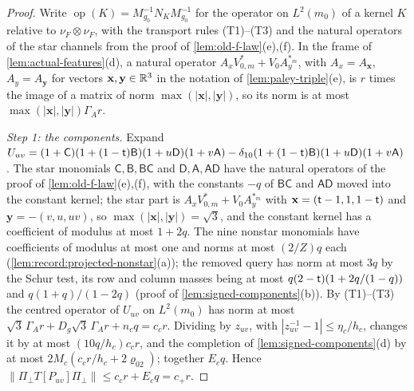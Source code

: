 \begin{proof}
Write $\operatorname{op}(K)=M_{g_0}^{-1}N_KM_{g_0}^{-1}$ for the operator on
$L^2(m_0)$ of a kernel $K$ relative to $\nu_F\otimes\nu_F$, with the transport
rules (T1)--(T3) and the natural operators of the star channels from the
proof of \cref{lem:old-f-law}(e),(f). In the frame of
\cref{lem:actual-features}(d), a natural operator $A_xV^*_{0,m}+V_0A_y^{*_m}$, with
$A_x=A_{\mathbf x}$, $A_y=A_{\mathbf y}$ for vectors $\mathbf x,\mathbf y\in\mathbb R^3$ in the
notation of \cref{lem:paley-triple}(e), is $r$ times the image of a matrix of norm
$\max(|\mathbf x|,|\mathbf y|)$, so its norm is at most $\max(|\mathbf x|,|\mathbf y|)\Gamma_Ar$.

\emph{Step 1: the components.} Expand
$U_{uv}=(1+\mathsf C)(1+(1-\mathsf t)\mathsf B)(1+u\mathsf D)(1+v\mathsf A)
-\delta_{10}(1+(1-\mathsf t)\mathsf B)(1+u\mathsf D)(1+v\mathsf A)$. The star monomials
$\mathsf C,\mathsf B,\mathsf B\mathsf C$ and $\mathsf D,\mathsf A,\mathsf A\mathsf D$ have the
natural operators of the proof of \cref{lem:old-f-law}(e),(f), with the constants
$-q$ of $\mathsf B\mathsf C$ and $\mathsf A\mathsf D$ moved into the constant kernel;
the star part is $A_xV^*_{0,m}+V_0A_y^{*_m}$ with
$\mathbf x=(\mathsf t-1,1,1-\mathsf t)$ and $\mathbf y=-(v,u,uv)$, so
$\max(|\mathbf x|,|\mathbf y|)=\sqrt3$, and the constant kernel has a coefficient of
modulus at most $1+2q$. The nine nonstar monomials have coefficients of modulus
at most one and norms at most $(2/Z)q$ each
(\cref{lem:record:projected-nonstar}(a)); the removed query has norm at most
$3q$ by the Schur test, its row and column masses being at most
$q(2-\mathsf t)(1+2q/(1-q))$ and $q(1+q)/(1-2q)$ (proof of
\cref{lem:signed-components}(b)). By (T1)--(T3) the centred operator of
$U_{uv}$ on $L^2(m_0)$ has norm at most
$\sqrt3\,\Gamma_Ar+D_g\sqrt3\,\Gamma_Ar+n_cq=c_cr$. Dividing by $z_{uv}$, with
$|z_{uv}^{-1}-1|\le\eta_c/h_c$, changes it by at most $(10q/h_c)c_cr$, and the
completion of \cref{lem:signed-components}(d) by at most
$2M_c(c_cr/h_c+2\varrho_{02})$; together $E_cq$. Hence
$\|\Pi_\perp T[P_{uv}]\Pi_\perp\|\le c_cr+E_cq=c_+r$.


\end{proof}
